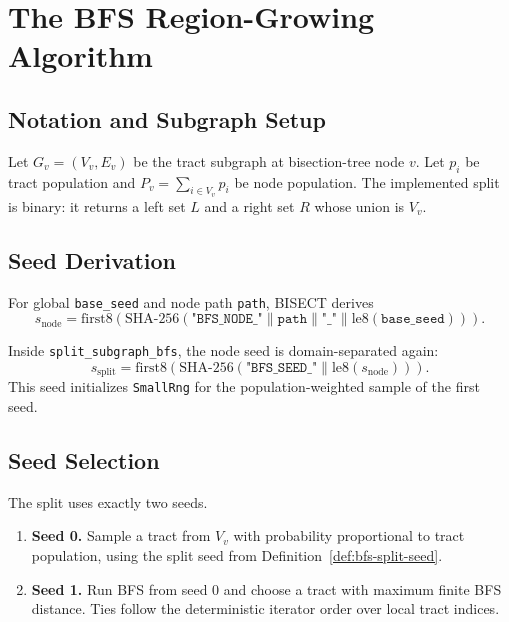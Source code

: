 \section{The BFS Region-Growing Algorithm}
\label{sec:algorithm}

\subsection{Notation and Subgraph Setup}

Let $G_v = (V_v, E_v)$ be the tract subgraph at bisection-tree node $v$.
Let $p_i$ be tract population and $P_v = \sum_{i \in V_v} p_i$ be node
population. The implemented split is binary: it returns a left set $L$ and a
right set $R$ whose union is $V_v$.

\subsection{Seed Derivation}

\begin{definition}
\label{def:bfs-node-seed}
For global \texttt{base\_seed} and node path \texttt{path}, BISECT derives
\[
  s_{\mathrm{node}} =
  \mathrm{first8}\left(\mathrm{SHA\text{-}256}
  (\texttt{"BFS\_NODE\_"} \parallel \mathtt{path} \parallel
  \texttt{"\_"} \parallel \mathrm{le8}(\mathtt{base\_seed}))\right).
\]
\end{definition}

\begin{definition}
\label{def:bfs-split-seed}
Inside \texttt{split\_subgraph\_bfs}, the node seed is domain-separated again:
\[
  s_{\mathrm{split}} =
  \mathrm{first8}\left(\mathrm{SHA\text{-}256}
  (\texttt{"BFS\_SEED\_"} \parallel \mathrm{le8}(s_{\mathrm{node}}))\right).
\]
This seed initializes \texttt{SmallRng} for the population-weighted sample of
the first seed.
\end{definition}

\subsection{Seed Selection}

The split uses exactly two seeds.

\begin{enumerate}
\item \textbf{Seed 0.} Sample a tract from $V_v$ with probability proportional
  to tract population, using the split seed from Definition~\ref{def:bfs-split-seed}.
\item \textbf{Seed 1.} Run BFS from seed 0 and choose a tract with maximum
  finite BFS distance. Ties follow the deterministic iterator order over local
  tract indices.
\end{enumerate}

